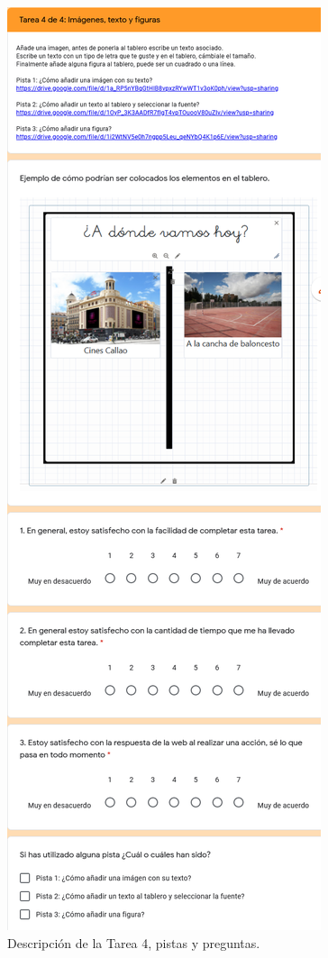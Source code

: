 \begin{figure}[h!]
	\centering
	\includegraphics[width=0.6\linewidth]{Imagenes/Bitmap/Tarea4Preguntas}
	\caption{Descripción de la Tarea 4, pistas y preguntas.}
	\label{fig:tarea4preguntas}
\end{figure}


